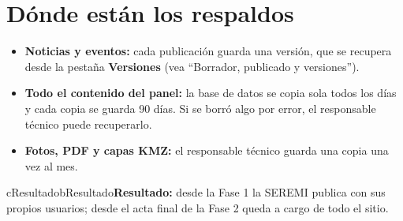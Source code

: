 \documentclass[11pt,letterpaper]{report}
\begin{document}
\section{Dónde están los respaldos}
\begin{itemize}
  \item \textbf{Noticias y eventos:} cada publicación guarda una versión, que se recupera desde la pestaña \textbf{Versiones} (vea “Borrador, publicado y versiones”).
  \item \textbf{Todo el contenido del panel:} la base de datos se copia sola todos los días y cada copia se guarda 90 días. Si se borró algo por error, el responsable técnico puede recuperarlo.
  \item \textbf{Fotos, PDF y capas KMZ:} el responsable técnico guarda una copia una vez al mes.
\end{itemize}
\begin{recuadro}{cResultado}{bResultado}\textbf{\color{bResultado}Resultado:} desde la Fase 1 la SEREMI publica con sus propios usuarios; desde el acta final de la Fase 2 queda a cargo de todo el sitio.\end{recuadro}
\end{document}
